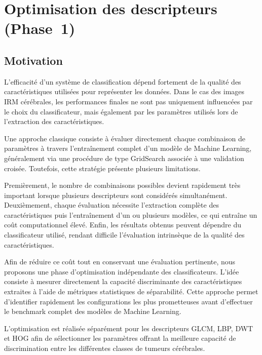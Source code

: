 \chapter{Optimisation des descripteurs (Phase~1)}

\section{Motivation}

L'efficacité d'un système de classification dépend fortement de la qualité des
caractéristiques utilisées pour représenter les données. Dans le cas des images IRM
cérébrales, les performances finales ne sont pas uniquement influencées par le choix du
classificateur, mais également par les paramètres utilisés lors de l'extraction des
caractéristiques.

Une approche classique consiste à évaluer directement chaque combinaison de paramètres à
travers l'entraînement complet d'un modèle de Machine Learning, généralement via une
procédure de type GridSearch associée à une validation croisée. Toutefois, cette stratégie
présente plusieurs limitations.

Premièrement, le nombre de combinaisons possibles devient rapidement très important lorsque
plusieurs descripteurs sont considérés simultanément. Deuxièmement, chaque évaluation
nécessite l'extraction complète des caractéristiques puis l'entraînement d'un ou plusieurs
modèles, ce qui entraîne un coût computationnel élevé. Enfin, les résultats obtenus peuvent
dépendre du classificateur utilisé, rendant difficile l'évaluation intrinsèque de la qualité
des caractéristiques.

Afin de réduire ce coût tout en conservant une évaluation pertinente, nous proposons une
phase d'optimisation indépendante des classificateurs. L'idée consiste à mesurer
directement la capacité discriminante des caractéristiques extraites à l'aide de métriques
statistiques de séparabilité. Cette approche permet d'identifier rapidement les
configurations les plus prometteuses avant d'effectuer le benchmark complet des modèles de
Machine Learning.

L'optimisation est réalisée séparément pour les descripteurs GLCM, LBP, DWT et HOG afin de
sélectionner les paramètres offrant la meilleure capacité de discrimination entre les
différentes classes de tumeurs cérébrales.

